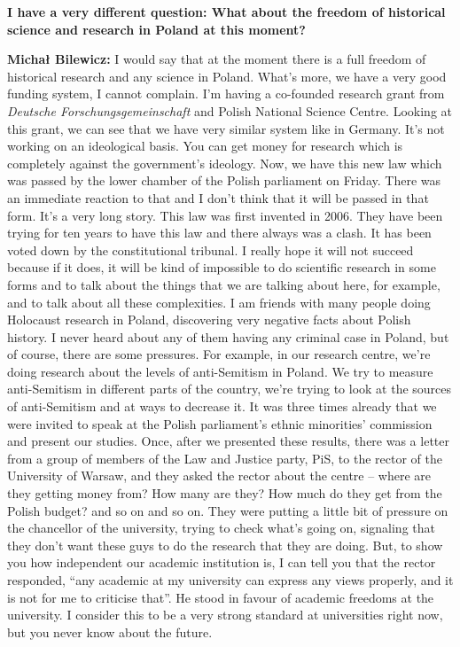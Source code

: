 \textbf{I have a very different question: What about the freedom of historical science and research in Poland at this moment?} 

\textbf{Michał Bilewicz:} I would say that at the moment there is a full freedom of historical research and any science in Poland. What’s more, we have a very good funding system, I cannot complain. I’m having a co-founded research grant from \textit{Deutsche Forschungsgemeinschaft} and Polish National Science Centre. Looking at this grant, we can see that we have very similar system like in Germany. It's not working on an ideological basis. You can get money for research which is completely against the government’s ideology. Now, we have this new law which was passed by the lower chamber of the Polish parliament on Friday. There was an immediate reaction to that and I don’t think that it will be passed in that form. It’s a very long story. This law was first invented in 2006. They have been trying for ten years to have this law and there always was a clash. It has been voted down by the constitutional tribunal. I really hope it will not succeed because if it does, it will be kind of impossible to do scientific research in some forms and to talk about the things that we are talking about here, for example, and to talk about all these complexities.
I am friends with many people doing Holocaust research in Poland, discovering very negative facts about Polish history. I never heard about any of them having any criminal case in Poland, but of course, there are some pressures. For example, in our research centre, we’re doing research about the levels of anti-Semitism in Poland. We try to measure anti-Semitism in different parts of the country, we're trying to look at the sources of anti-Semitism and at ways to decrease it. It was three times already that we were invited to speak at the Polish parliament’s ethnic minorities’ commission and present our studies. Once, after we presented these results, there was a letter from a group of members of the Law and Justice party, PiS, to the rector of the University of Warsaw, and they asked the rector about the centre – where are they getting money from? How many are they? How much do they get from the Polish budget? and so on and so on. They were putting a little bit of pressure on the chancellor of the university, trying to check what’s going on, signaling that they don’t want these guys to do the research that they are doing. But, to show you how independent our academic institution is, I can tell you that the rector responded, ``any academic at my university can express any views properly, and it is not for me to criticise that''. He stood in favour of academic freedoms at the university. I consider this to be a very strong standard at universities right now, but you never know about the future.

